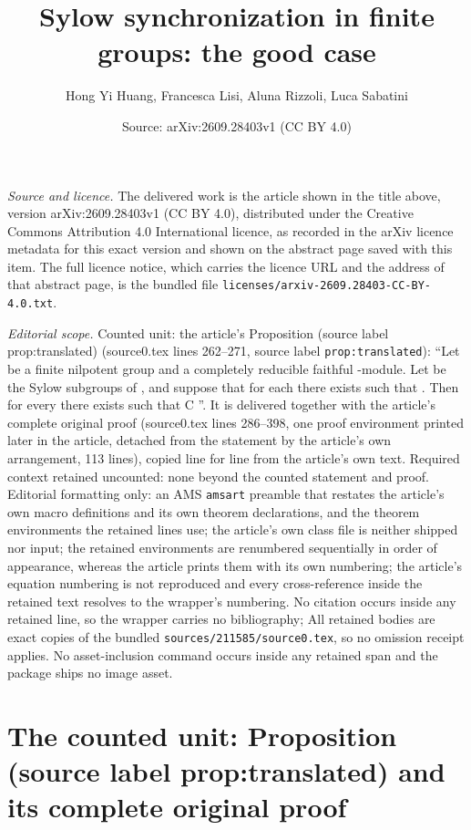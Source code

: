 \documentclass[10pt,a4paper]{amsart}
\title[Sylow synchronization in finite groups: the good case]{Sylow synchronization in finite groups: the good case}
\author{Hong Yi Huang, Francesca Lisi, Aluna Rizzoli, Luca Sabatini}
\date{Source: arXiv:2609.28403v1 (CC BY 4.0)}
\theoremstyle{plain}
\theoremstyle{definition}
\theoremstyle{remark}
\begin{document}
\maketitle

\noindent\emph{Source and licence.} The delivered work is the article shown in the title above, version arXiv:2609.28403v1 (CC BY 4.0), distributed under the Creative Commons Attribution 4.0 International licence, as recorded in the arXiv licence metadata for this exact version and shown on the abstract page saved with this item. The full licence notice, which carries the licence URL and the address of that abstract page, is the bundled file \texttt{licenses/arxiv-2609.28403-CC-BY-4.0.txt}.
\par\smallskip

\noindent\textit{Editorial scope.} Counted unit: the article's Proposition (source label prop:translated) (source0.tex lines 262--271, source label \texttt{prop:translated}): ``Let be a finite nilpotent group and a completely reducible faithful -module. Let be the Sylow subgroups of , and suppose that for each there exists such that . Then for every there exists such that C ''. It is delivered together with the article's complete original proof (source0.tex lines 286--398, one proof environment printed later in the article, detached from the statement by the article's own arrangement, 113 lines), copied line for line from the article's own text. Required context retained uncounted: none beyond the counted statement and proof. Editorial formatting only: an AMS \texttt{amsart} preamble that restates the article's own macro definitions and its own theorem declarations, and the theorem environments the retained lines use; the article's own class file is neither shipped nor input; the retained environments are renumbered sequentially in order of appearance, whereas the article prints them with its own numbering; the article's equation numbering is not reproduced and every cross-reference inside the retained text resolves to the wrapper's numbering. No citation occurs inside any retained line, so the wrapper carries no bibliography; All retained bodies are exact copies of the bundled \texttt{sources/211585/source0.tex}, so no omission receipt applies. No asset-inclusion command occurs inside any retained span and the package ships no image asset.


\section{The counted unit: Proposition (source label prop:translated) and its complete original proof}
\end{document}
